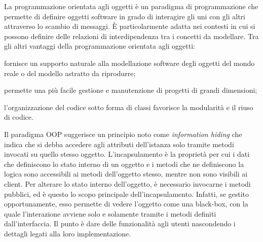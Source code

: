 La programmazione orientata agli oggetti è un paradigma di
programmazione che permette di definire oggetti software in grado di interagire
gli uni con gli altri attraverso lo scambio di messaggi. È particolarmente
adatta nei contesti in cui si possono definire delle relazioni di interdipendenza
tra i concetti da modellare.
Tra gli altri vantaggi della programmazione orientata agli oggetti:
\begin{enumerate*}[label={\alph*)},font={\bfseries}]
\item fornisce un supporto naturale alla modellazione software degli oggetti del
mondo reale o del modello astratto da riprodurre;
\item permette una più facile gestione e manutenzione di progetti di grandi
dimensioni;
\item l'organizzazione del codice sotto forma di classi favorisce la modularità
e il riuso di codice.
\end{enumerate*}
Il paradigma OOP suggerisce un principio noto come \emph{information hiding} che
indica che si debba accedere agli attributi dell'istanza solo tramite metodi
invocati su quello stesso oggetto.
L'incapsulamento è la proprietà per cui i dati che definiscono lo stato interno
di un oggetto e i metodi che ne definiscono la logica sono accessibili ai metodi
dell'oggetto stesso, mentre non sono visibili ai client. Per alterare lo stato
interno dell'oggetto, è necessario invocarne i metodi pubblici, ed è questo lo
scopo principale dell'incapsulamento. Infatti, se gestito opportunamente, esso
permette di vedere l'oggetto come una black-box, con la quale l'interazione
avviene solo e solamente tramite i metodi definiti dall'interfaccia.
Il punto è dare delle funzionalità agli utenti nascondendo i dettagli legati
alla loro implementazione.\cite{cox1991object}
